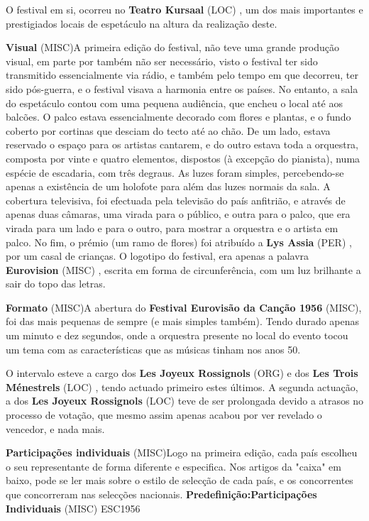 \documentclass[12pt,a4paper]{article}
\begin{document}
O festival em si, ocorreu no \textbf{Teatro Kursaal} (LOC) , um dos mais importantes e prestigiados locais de espetáculo na altura da realização deste.



\textbf{Visual} (MISC)A primeira edição do festival, não teve uma grande produção visual, em parte por também não ser necessário, visto o festival ter sido transmitido essencialmente via rádio, e também pelo tempo em que decorreu, ter sido pós-guerra, e o festival visava a harmonia entre os países. No entanto, a sala do espetáculo contou com uma pequena audiência, que encheu o local até aos balcões. O palco estava essencialmente decorado com flores e plantas, e o fundo coberto por cortinas que desciam do tecto até ao chão. De um lado, estava reservado o espaço para os artistas cantarem, e do outro estava toda a orquestra, composta por vinte e quatro elementos, dispostos (à excepção do pianista), numa espécie de escadaria, com três degraus. As luzes foram simples, percebendo-se apenas a existência de um holofote para além das luzes normais da sala. A cobertura televisiva, foi efectuada pela televisão do país anfitrião, e através de apenas duas câmaras, uma virada para o público, e outra para o palco, que era virada para um lado e para o outro, para mostrar a orquestra e o artista em palco. No fim, o prémio (um ramo de flores) foi atribuído a \textbf{Lys Assia} (PER) , por um casal de crianças. O logotipo do festival, era apenas a palavra \textbf{Eurovision} (MISC) , escrita em forma de circunferência, com um luz brilhante a sair do topo das letras.



\textbf{Formato} (MISC)A abertura do \textbf{Festival Eurovisão da Canção 1956} (MISC), foi das mais pequenas de sempre (e mais simples também). Tendo durado apenas um minuto e dez segundos, onde a orquestra presente no local do evento tocou um tema com as características que as músicas tinham nos anos 50.

O intervalo esteve a cargo dos \textbf{Les Joyeux Rossignols} (ORG) e dos \textbf{Les Trois Ménestrels} (LOC) , tendo actuado primeiro estes últimos. A segunda actuação, a dos \textbf{Les Joyeux Rossignols} (LOC) teve de ser prolongada devido a atrasos no processo de votação, que mesmo assim apenas acabou por ver revelado o vencedor, e nada mais.



\textbf{Participações individuais} (MISC)Logo na primeira edição, cada país escolheu o seu representante de forma diferente e especifica. Nos artigos da "caixa" em baixo, pode se ler mais sobre o estilo de selecção de cada país, e os concorrentes que concorreram nas selecções nacionais. \textbf{Predefinição:Participações Individuais} (MISC) ESC1956
\end{document}
